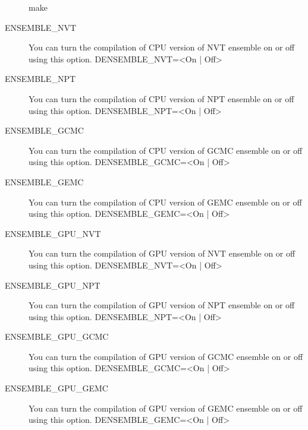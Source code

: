 \documentclass[letterpaper,10pt,english]{sphinxmanual}
\begin{document}
\begin{description}
\begin{sphinxVerbatim}[commandchars=\\\{\}]
\PYGZdl{} make
\end{sphinxVerbatim}

\item[{ENSEMBLE\_NVT}] \leavevmode
\sphinxAtStartPar
You can turn the compilation of CPU version of NVT ensemble on or off using this option.
\sphinxhyphen{}DENSEMBLE\_NVT=\textless{}On | Off\textgreater{}

\item[{ENSEMBLE\_NPT}] \leavevmode
\sphinxAtStartPar
You can turn the compilation of CPU version of NPT ensemble on or off using this option.
\sphinxhyphen{}DENSEMBLE\_NPT=\textless{}On | Off\textgreater{}

\item[{ENSEMBLE\_GCMC}] \leavevmode
\sphinxAtStartPar
You can turn the compilation of CPU version of GCMC ensemble on or off using this option.
\sphinxhyphen{}DENSEMBLE\_GCMC=\textless{}On | Off\textgreater{}

\item[{ENSEMBLE\_GEMC}] \leavevmode
\sphinxAtStartPar
You can turn the compilation of CPU version of GEMC ensemble on or off using this option.
\sphinxhyphen{}DENSEMBLE\_GEMC=\textless{}On | Off\textgreater{}

\item[{ENSEMBLE\_GPU\_NVT}] \leavevmode
\sphinxAtStartPar
You can turn the compilation of GPU version of NVT ensemble on or off using this option.
\sphinxhyphen{}DENSEMBLE\_NVT=\textless{}On | Off\textgreater{}

\item[{ENSEMBLE\_GPU\_NPT}] \leavevmode
\sphinxAtStartPar
You can turn the compilation of GPU version of NPT ensemble on or off using this option.
\sphinxhyphen{}DENSEMBLE\_NPT=\textless{}On | Off\textgreater{}

\item[{ENSEMBLE\_GPU\_GCMC}] \leavevmode
\sphinxAtStartPar
You can turn the compilation of GPU version of GCMC ensemble on or off using this option.
\sphinxhyphen{}DENSEMBLE\_GCMC=\textless{}On | Off\textgreater{}

\item[{ENSEMBLE\_GPU\_GEMC}] \leavevmode
\sphinxAtStartPar
You can turn the compilation of GPU version of GEMC ensemble on or off using this option.
\sphinxhyphen{}DENSEMBLE\_GEMC=\textless{}On | Off\textgreater{}

\end{description}
\end{document}
